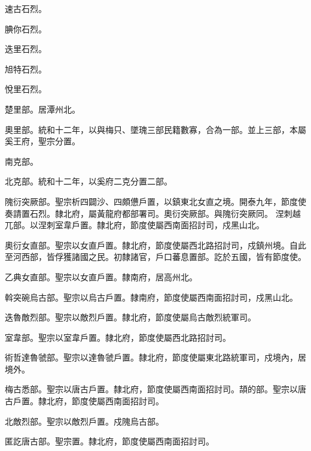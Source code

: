 \begin{pinyinscope}
 速古石烈。



 腆你石烈。



 迭里石烈。



 旭特石烈。



 悅里石烈。



 楚里部。居潭州北。



 奧里部。統和十二年，以與梅只、墜瑰三部民籍數寡，合為一部。並上三部，本屬奚王府，聖宗分置。



 南克部。



 北克部。統和十二年，以奚府二克分置二部。



 隗衍突厥部。聖宗析四闢沙、四頗憊戶置，以鎮東北女直之境。開泰九年，節度使奏請置石烈。隸北府，屬黃龍府都部署司。奧衍突厥部。與隗衍突厥同。
 涅刺越兀部。以涅刺室韋戶置。隸北府，節度使屬西南面招討司，戍黑山北。



 奧衍女直部。聖宗以女直戶置。隸北府，節度使屬西北路招討司，戍鎮州境。自此至河西部，皆俘獲諸國之民。初隸諸官，戶口蕃息置部。訖於五國，皆有節度使。



 乙典女直部。聖宗以女直戶置。隸南府，居高州北。



 斡突碗烏古部。聖宗以烏古戶置。隸南府，節度使屬西南面招討司，戍黑山北。



 迭魯敵烈部。聖宗以敵烈戶置。隸北府，節度使屬烏古敵烈統軍司。



 室韋部。聖宗以室韋戶置。隸北府，節度使屬西北路招討司。



 術哲達魯虢部。聖宗以達魯虢戶置。隸北府，節度使屬東北路統軍司，戍境內，居境外。



 梅古悉部。聖宗以唐古戶置。隸北府，節度使屬西南面招討司。頡的部。聖宗以唐古戶置。隸北府，節度使屬西南面招討司。



 北敵烈部。聖宗以敵烈戶置。戍隗烏古部。



 匿訖唐古部。聖宗置。隸北府，節度使屬西南面招討司。




\end{pinyinscope}
